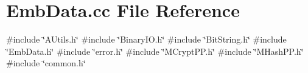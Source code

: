 \section{Emb\+Data.\+cc File Reference}
\label{EmbData_8cc}
{\ttfamily \#include \char`\"{}A\+Utils.\+h\char`\"{}}\newline
{\ttfamily \#include \char`\"{}Binary\+I\+O.\+h\char`\"{}}\newline
{\ttfamily \#include \char`\"{}Bit\+String.\+h\char`\"{}}\newline
{\ttfamily \#include \char`\"{}Emb\+Data.\+h\char`\"{}}\newline
{\ttfamily \#include \char`\"{}error.\+h\char`\"{}}\newline
{\ttfamily \#include \char`\"{}M\+Crypt\+P\+P.\+h\char`\"{}}\newline
{\ttfamily \#include \char`\"{}M\+Hash\+P\+P.\+h\char`\"{}}\newline
{\ttfamily \#include \char`\"{}common.\+h\char`\"{}}\newline
